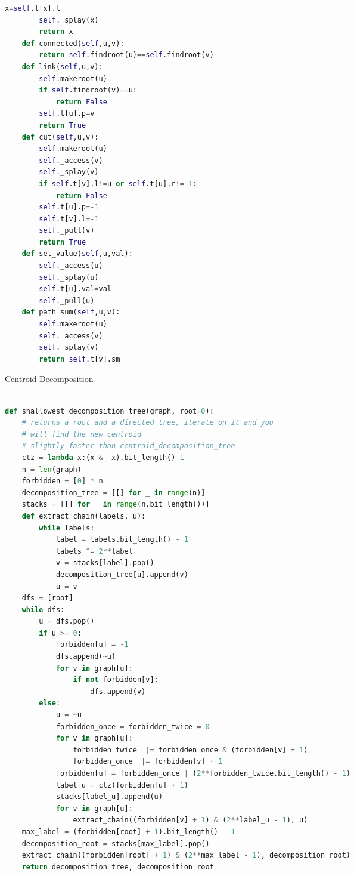 \documentclass[10pt,landscape, a4paper]{article}
\begin{document}
\begin{multicols*}{3}
\begin{lstlisting}[language=Python]
            x=self.t[x].l
        self._splay(x)
        return x
    def connected(self,u,v):
        return self.findroot(u)==self.findroot(v)
    def link(self,u,v):
        self.makeroot(u)
        if self.findroot(v)==u:
            return False
        self.t[u].p=v
        return True
    def cut(self,u,v):
        self.makeroot(u)
        self._access(v)
        self._splay(v)
        if self.t[v].l!=u or self.t[u].r!=-1:
            return False
        self.t[u].p=-1
        self.t[v].l=-1
        self._pull(v)
        return True
    def set_value(self,u,val):
        self._access(u)
        self._splay(u)
        self.t[u].val=val
        self._pull(u)
    def path_sum(self,u,v):
        self.makeroot(u)
        self._access(v)
        self._splay(v)
        return self.t[v].sm
\end{lstlisting}

Centroid Decomposition
\begin{lstlisting}[language=Python]

def shallowest_decomposition_tree(graph, root=0):
    # returns a root and a directed tree, iterate on it and you
    # will find the new centroid
    # slightly faster than centroid_decomposition_tree
    ctz = lambda x:(x & -x).bit_length()-1
    n = len(graph)
    forbidden = [0] * n
    decomposition_tree = [[] for _ in range(n)]
    stacks = [[] for _ in range(n.bit_length())]
    def extract_chain(labels, u):
        while labels:
            label = labels.bit_length() - 1
            labels ^= 2**label
            v = stacks[label].pop()
            decomposition_tree[u].append(v)
            u = v
    dfs = [root]
    while dfs:
        u = dfs.pop()
        if u >= 0:
            forbidden[u] = -1
            dfs.append(~u)
            for v in graph[u]:
                if not forbidden[v]:
                    dfs.append(v)
        else:
            u = ~u
            forbidden_once = forbidden_twice = 0
            for v in graph[u]:
                forbidden_twice  |= forbidden_once & (forbidden[v] + 1)
                forbidden_once  |= forbidden[v] + 1
            forbidden[u] = forbidden_once | (2**forbidden_twice.bit_length() - 1)
            label_u = ctz(forbidden[u] + 1)
            stacks[label_u].append(u)
            for v in graph[u]:
                extract_chain((forbidden[v] + 1) & (2**label_u - 1), u)
    max_label = (forbidden[root] + 1).bit_length() - 1
    decomposition_root = stacks[max_label].pop()
    extract_chain((forbidden[root] + 1) & (2**max_label - 1), decomposition_root)
    return decomposition_tree, decomposition_root


\end{lstlisting}
\end{multicols*}
\end{document}
